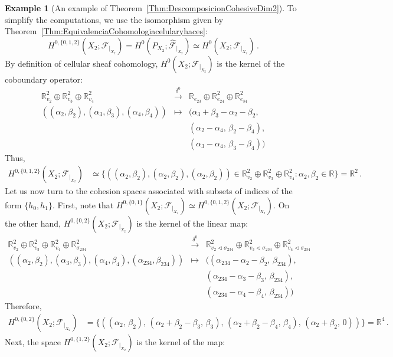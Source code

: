 \documentclass[reqno,12pt]{amsart}
\newcommand{\R}{\mathbb{R}}
\newcommand{\cF}{{\mathcal F}}
\newcommand{\0}{\mathbf 0}
\theoremstyle{definition}
\newtheorem{example}[theorem]{Example}
\begin{document}
\begin{example}[An example of Theorem~\ref{Thm:DescomposicionCohesiveDim2}]
To simplify the computations, we use the isomorphism given by Theorem~\ref{Thm:EquivalenciaCohomologiacelularyhaces}:
\[
H^{0,\{0,1,2\}}(X_2;\cF_{|_{X_2}})=H^{0}(P_{X_2};\widehat{\cF}_{|_{X_2}})\simeq H^0(X_2;\cF_{|_{X_2}})\,.
\]
By definition of cellular sheaf cohomology, $H^0(X_2;\cF_{|_{X_2}})$ is the kernel of the coboundary operator:
\[
\begin{array}{ccc}
  \R^2_{v_2}\oplus \R_{v_3}^2\oplus \R_{v_4}^2  & \stackrel{\delta^0}\longrightarrow& \R_{e_{23}}\oplus\R_{e_{24}}^2\oplus \R^2_{e_{34}}\\[1.5ex]
   ((\alpha_2,\beta_2),(\alpha_3,\beta_3),(\alpha_4,\beta_4))& \longmapsto & (\alpha_3+\beta_3-\alpha_2-\beta_2,\\  & & (\alpha_2-\alpha_4,\,\beta_{2}-\beta_4),\\& & (\alpha_3-\alpha_4,\,\beta_{3}-\beta_4)) 
\end{array}
\]
Thus,
\[
\begin{aligned}
    H^{0,\{0,1,2\}}(X_2;\cF_{|_{X_2}})&\simeq\{((\alpha_2,\beta_2),(\alpha_2,\beta_2),(\alpha_2,\beta_2))\in \R^2_{v_2}\oplus \R_{v_3}^2\oplus \R_{v_4}^2 : \alpha_2,\beta_2\in\R\}=\R^2\,.
\end{aligned}
\]
Let us now turn to the cohesion spaces associated with subsets of indices of the form $\{h_0,h_1\}$. First, note that $H^{0,\{0,1\}}(X_2;\cF_{|_{X_2}})\simeq H^{0,\{0,1,2\}}(X_2;\cF_{|_{X_2}})$. On the other hand, $H^{0,\{0,2\}}(X_2;\cF_{|_{X_2}})$ is the kernel of the linear map:
\[
\begin{array}{ccc}
    \R^2_{v_2}\oplus \R_{v_3}^2\oplus \R_{v_4}^2\oplus \R_{\sigma_{234}}^2& \stackrel{\delta^0}\longrightarrow &  \R^2_{v_2\lhd \sigma_{234}}\oplus \R^2_{v_3\lhd \sigma_{234}}\oplus\R^2_{v_4\lhd \sigma_{234}} \\[1.5ex]
      ((\alpha_2,\beta_2),(\alpha_3,\beta_3),(\alpha_4,\beta_4),(\alpha_{234},\beta_{234}))& \longmapsto & ((\alpha_{234}-\alpha_2-\beta_2,\,\beta_{234}),\\  & & (\alpha_{234}-\alpha_3-\beta_3,\,\beta_{234}),\\& & (\alpha_{234}-\alpha_4-\beta_4,\,\beta_{234}))
\end{array}
\]
Therefore,
\[
\begin{aligned}
    H^{0,\{0,2\}}(X_2;\cF_{|_{X_2}})&=\{((\alpha_2,\,\beta_2),\,(\alpha_2+\beta_2-\beta_3,\,\beta_3),\,(\alpha_2+\beta_2-\beta_4,\,\beta_4),\,(\alpha_2+\beta_2,\,0)) \}=\R^4\,.
\end{aligned}
\]
Next, the space $H^{0,\{1,2\}}(X_2;\cF_{|_{X_2}})$ is the kernel of the map:

\end{example}
\end{document}
